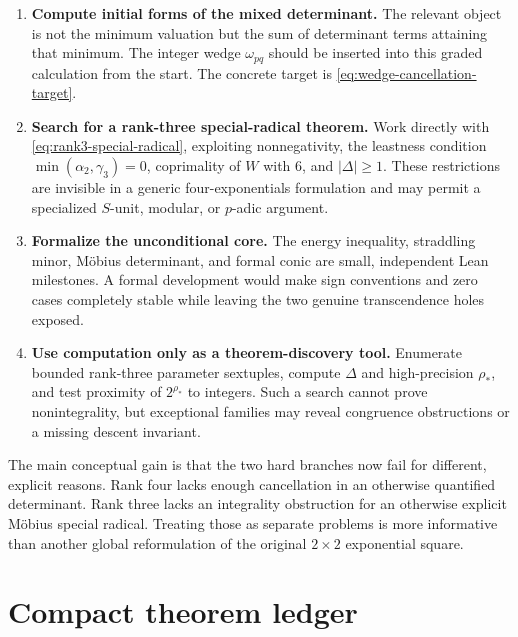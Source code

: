 \documentclass[11pt,oneside]{article}
\theoremstyle{research}
\theoremstyle{definition}
\begin{document}
\begin{enumerate}[label=\textbf{P\arabic*.},leftmargin=3em]
\item \textbf{Compute initial forms of the mixed determinant.}
  The relevant object is not the minimum valuation but the sum of determinant
  terms attaining that minimum.  The integer wedge $\omega_{pq}$ should be
  inserted into this graded calculation from the start.  The concrete target
  is \eqref{eq:wedge-cancellation-target}.

\item \textbf{Search for a rank-three special-radical theorem.}
  Work directly with \eqref{eq:rank3-special-radical}, exploiting
  nonnegativity, the leastness condition
  $\min(\alpha_2,\gamma_3)=0$, coprimality of $W$ with $6$, and
  $|\Delta|\ge1$.  These restrictions are invisible in a generic
  four-exponentials formulation and may permit a specialized $S$-unit,
  modular, or $p$-adic argument.

\item \textbf{Formalize the unconditional core.}
  The energy inequality, straddling minor, M\"obius determinant, and formal
  conic are small, independent Lean milestones.  A formal development would
  make sign conventions and zero cases completely stable while leaving the
  two genuine transcendence holes exposed.

\item \textbf{Use computation only as a theorem-discovery tool.}
  Enumerate bounded rank-three parameter sextuples, compute $\Delta$ and
  high-precision $\rho_*$, and test proximity of $2^{\rho_*}$ to integers.
  Such a search cannot prove nonintegrality, but exceptional families may
  reveal congruence obstructions or a missing descent invariant.
\end{enumerate}

The main conceptual gain is that the two hard branches now fail for different,
explicit reasons.  Rank four lacks enough cancellation in an otherwise
quantified determinant.  Rank three lacks an integrality obstruction for an
otherwise explicit M\"obius special radical.  Treating those as separate
problems is more informative than another global reformulation of the original
$2\times2$ exponential square.

\appendix

\section{Compact theorem ledger}
\label{app:theorem-ledger}
\end{document}

